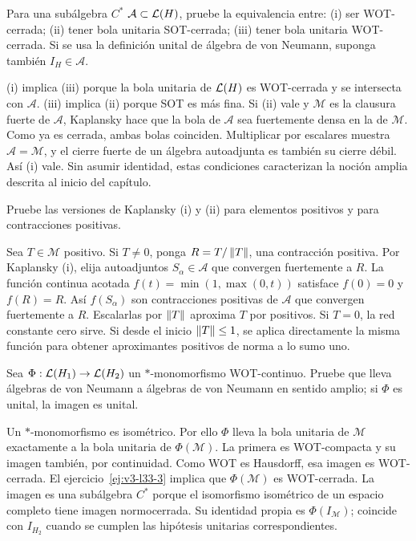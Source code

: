 \begin{ejercicio}\label{ej:v3-l33-3}
Para una subálgebra $C^*$ $\mathcal A\subset\mathcal L(H)$, pruebe la equivalencia entre: (i) ser WOT-cerrada; (ii) tener bola unitaria SOT-cerrada; (iii) tener bola unitaria WOT-cerrada. Si se usa la definición unital de álgebra de von Neumann, suponga también $I_H\in\mathcal A$.
\end{ejercicio}
\begin{solucion}
(i) implica (iii) porque la bola unitaria de $\mathcal L(H)$ es WOT-cerrada y se intersecta con $\mathcal A$. (iii) implica (ii) porque SOT es más fina. Si (ii) vale y $\mathcal M$ es la clausura fuerte de $\mathcal A$, Kaplansky hace que la bola de $\mathcal A$ sea fuertemente densa en la de $\mathcal M$. Como ya es cerrada, ambas bolas coinciden. Multiplicar por escalares muestra $\mathcal A=\mathcal M$, y el cierre fuerte de un álgebra autoadjunta es también su cierre débil. Así (i) vale. Sin asumir identidad, estas condiciones caracterizan la noción amplia descrita al inicio del capítulo.
\end{solucion}

\begin{ejercicio}\label{ej:v3-l33-4}
Pruebe las versiones de Kaplansky (i) y (ii) para elementos positivos y para contracciones positivas.
\end{ejercicio}
\begin{solucion}
Sea $T\in\mathcal M$ positivo. Si $T\ne0$, ponga $R=T/\left\lVert T\right\rVert$, una contracción positiva. Por Kaplansky (i), elija autoadjuntos $S_\alpha\in\mathcal A$ que convergen fuertemente a $R$. La función continua acotada $f(t)=\min(1,\max(0,t))$ satisface $f(0)=0$ y $f(R)=R$. Así $f(S_\alpha)$ son contracciones positivas de $\mathcal A$ que convergen fuertemente a $R$. Escalarlas por $\left\lVert T\right\rVert$ aproxima $T$ por positivos. Si $T=0$, la red constante cero sirve. Si desde el inicio $\left\lVert T\right\rVert\le1$, se aplica directamente la misma función para obtener aproximantes positivos de norma a lo sumo uno.
\end{solucion}

\begin{ejercicio}\label{ej:v3-l33-5}
Sea $\Phi:\mathcal L(H_1)\to\mathcal L(H_2)$ un $*$-monomorfismo WOT-continuo. Pruebe que lleva álgebras de von Neumann a álgebras de von Neumann en sentido amplio; si $\Phi$ es unital, la imagen es unital.
\end{ejercicio}
\begin{solucion}
Un $*$-monomorfismo es isométrico. Por ello $\Phi$ lleva la bola unitaria de $\mathcal M$ exactamente a la bola unitaria de $\Phi(\mathcal M)$. La primera es WOT-compacta y su imagen también, por continuidad. Como WOT es Hausdorff, esa imagen es WOT-cerrada. El ejercicio~\ref{ej:v3-l33-3} implica que $\Phi(\mathcal M)$ es WOT-cerrada. La imagen es una subálgebra $C^*$ porque el isomorfismo isométrico de un espacio completo tiene imagen normocerrada. Su identidad propia es $\Phi(I_{\mathcal M})$; coincide con $I_{H_2}$ cuando se cumplen las hipótesis unitarias correspondientes.
\end{solucion}

